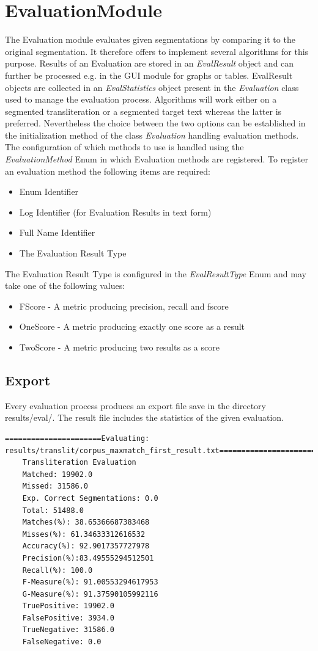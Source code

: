 \documentclass[10pt,a4paper,titlepage]{report}
\begin{document}
	\section{EvaluationModule}
	\label{sec:evaluationModule}
	The Evaluation module evaluates given segmentations by comparing it to the original segmentation. It therefore offers to implement several algorithms for this purpose. Results of an Evaluation are stored in an \textit{EvalResult} object and can further be processed e.g. in the GUI module for graphs or tables. EvalResult objects are collected in an \textit{EvalStatistics} object present in the \textit{Evaluation} class used to manage the evaluation process.  Algorithms will work either on a segmented transliteration or a segmented target text whereas the latter is preferred. Nevertheless the choice between the two options can be established in the initialization method of the class \textit{Evaluation} handling evaluation methods. The configuration of which methods to use is handled using the \textit{EvaluationMethod} Enum in which Evaluation methods are registered. To register an evaluation method the following items are required:
	\begin{itemize}
		\item Enum Identifier
		\item Log Identifier (for Evaluation Results in text form)
		\item Full Name Identifier
		\item The Evaluation Result Type
	\end{itemize}
	The Evaluation Result Type is configured in the \textit{EvalResultType} Enum and may take one of the following values:
	\begin{itemize}
		\item FScore - A metric producing precision, recall and fscore
		\item OneScore - A metric producing exactly one score as a result
		\item TwoScore - A metric producing two results as a score
	\end{itemize}
	\subsection{Export}
	Every evaluation process produces an export file save in the directory results/eval/. The result file includes the statistics of the given evaluation. 
	\begin{lstlisting}[caption=Evaluation File]
	======================Evaluating: results/translit/corpus_maxmatch_first_result.txt===========================
	Transliteration Evaluation
	Matched: 19902.0
	Missed: 31586.0
	Exp. Correct Segmentations: 0.0
	Total: 51488.0
	Matches(%): 38.65366687383468
	Misses(%): 61.34633312616532
	Accuracy(%): 92.9017357727978
	Precision(%):83.49555294512501
	Recall(%): 100.0
	F-Measure(%): 91.00553294617953
	G-Measure(%): 91.37590105992116
	TruePositive: 19902.0
	FalsePositive: 3934.0
	TrueNegative: 31586.0
	FalseNegative: 0.0
	\end{lstlisting}
\end{document}
